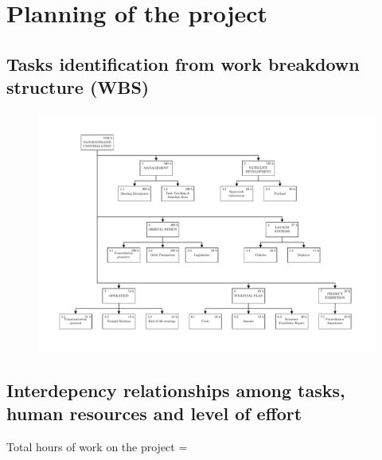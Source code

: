 \section{Planning of the project}

\subsection{Tasks identification from work breakdown structure (WBS)}
%
\begin{figure}[h]
\includegraphics[width=1.1\textwidth]{./external_pdf/G4-PC-WBS-10-04.pdf}
\end{figure}
\pagebreak


\subsection{Interdepency relationships among tasks, human resources and level of effort}


Total hours of work on the project = 

